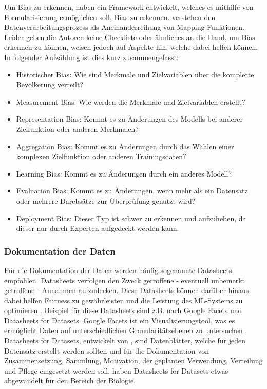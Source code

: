 Um Bias zu erkennen, haben \cite{suresh2021framework} ein Framework entwickelt, welches es mithilfe von Formularisierung ermöglichen soll, Bias zu erkennen. \cite{suresh2021framework} verstehen den Datenverarbeitungsprozess als Aneinanderreihung von Mapping-Funktionen. Leider geben die Autoren keine Checkliste oder ähnliches an die Hand, um Bias erkennen zu können, weisen jedoch auf Aspekte hin, welche dabei helfen können. In folgender Aufzählung ist dies kurz zusammengefasst:
\begin{itemize}
    \item Historischer Bias: Wie sind Merkmale und Zielvariablen über die komplette Bevölkerung verteilt?
    \item Measurement Bias: Wie werden die Merkmale und Zielvariablen erstellt?
    \item Representation Bias: Kommt es zu Änderungen des Modells bei anderer Zielfunktion oder anderen Merkmalen?
    \item Aggregation Bias: Kommt es zu Änderungen durch das Wählen einer komplexen Zielfunktion oder anderen Trainingsdaten?
    \item Learning Bias: Kommt es zu Änderungen durch ein anderes Modell?
    \item Evaluation Bias: Kommt es zu Änderungen, wenn mehr als ein Datensatz oder mehrere Darebsätze zur Überprüfung genutzt wird?
    \item Deployment Bias: Dieser Typ ist schwer zu erkennen und aufzuheben, da dieser nur durch Experten aufgedeckt werden kann.
\end{itemize}

\subsubsection{Dokumentation der Daten}
Für die Dokumentation der Daten werden häufig sogenannte Datasheets empfohlen. Datasheets verfolgen den Zweck getroffene - eventuell unbemerkt getroffene - Annahmen aufzudecken. Diese Datasheets können darüber hinaus dabei helfen Fairness zu gewährleisten und die Leistung des ML-Systems zu optimieren \cite{vaughan2020human}. 
Beispiel für diese Datasheets sind z.B. nach \cite{vaughan2020human} Google Facets und Datasheets for Datasets.
Google Facets ist ein Visualisierungstool, was es ermöglicht Daten auf unterschiedlichen Granularitätsebenen zu untersuchen \cite{GoogleFacets}.
Datasheets for Datasets, entwickelt von \cite{gebru2021datasheets}, sind Datenblätter, welche für jeden Datensatz erstellt werden sollten und für die Dokumentation von Zusammensetzung, Sammlung, Motivation, der geplanten Verwendung, Verteilung und Pflege eingesetzt werden soll.
\cite{grasso2020applying} haben Datasheets for Datasets etwas abgewandelt für den Bereich der Biologie.

